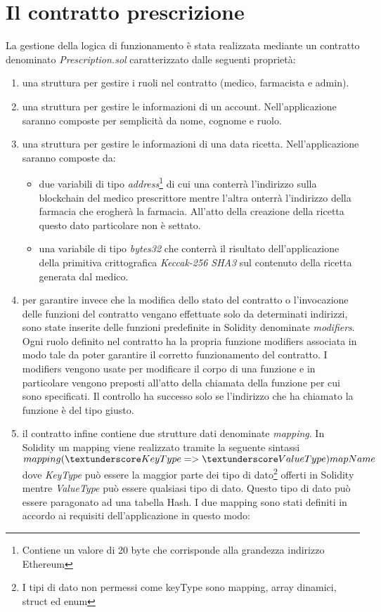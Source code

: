 \section{Il contratto prescrizione}
%
La gestione della logica di funzionamento è stata realizzata mediante un contratto denominato \emph{Prescription.sol} caratterizzato dalle seguenti proprietà:
\begin{enumerate}
	\item una struttura per gestire i ruoli nel contratto (medico, farmacista e admin).
	\item una struttura per gestire le informazioni di un account. Nell'applicazione saranno composte per semplicità da nome, cognome e ruolo.
	\item una struttura per gestire le informazioni di una data ricetta. Nell'applicazione saranno composte da:
	      \begin{itemize}
	      	\item due variabili di tipo \emph{address}\footnote{Contiene un valore di 20 byte che corrisponde alla grandezza  indirizzo Ethereum} di cui una conterrà l'indirizzo sulla blockchain del medico prescrittore mentre l'altra onterrà l'indirizzo della farmacia che erogherà la farmacia. All'atto della creazione della ricetta questo dato particolare non è settato.
	      	\item una variabile di tipo \emph{bytes32} che conterrà il risultato dell'applicazione della primitiva crittografica \emph{Keccak-256 SHA3} sul contenuto della ricetta generata dal medico.
	      \end{itemize}
	\item per garantire invece che la modifica dello stato del contratto o l'invocazione delle funzioni del contratto vengano effettuate solo da determinati indirizzi, sono state inserite delle funzioni predefinite in Solidity denominate \emph{modifiers}. Ogni ruolo definito nel contratto ha la propria funzione modifiers associata in modo tale da poter garantire il corretto funzionamento del contratto. I modifiers vengono usate per modificare il corpo di una funzione e in particolare vengono preposti all'atto della chiamata della funzione per cui sono specificati. Il controllo ha successo solo se l'indirizzo che ha chiamato la funzione è del tipo giusto.
	\item il contratto infine contiene due strutture dati denominate \emph{mapping}. In Solidity un mapping  viene realizzato tramite la seguente sintassi $mapping (\textunderscore KeyType => \textunderscore ValueType) mapName$ dove \emph{\textunderscore KeyType} può essere la maggior parte dei tipo di dato\footnote{I tipi di dato non permessi come keyType sono mapping, array dinamici, struct ed enum} offerti in Solidity mentre \emph{\textunderscore ValueType} può essere qualsiasi tipo di dato. Questo tipo di dato può essere paragonato ad una tabella Hash. I due mapping sono stati definiti in accordo ai requisiti dell'applicazione in questo modo:

\end{enumerate}
